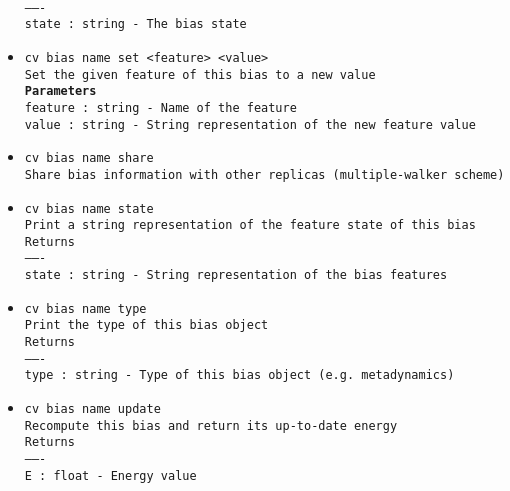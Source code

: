 \begin{itemize}
\\
\texttt{-------}
\\
\texttt{state : string - The bias state}
\item \texttt{cv bias name set <feature> <value>}
\\
\texttt{Set the given feature of this bias to a new value}
\\
\texttt{\textbf{Parameters}}
\\
\texttt{feature : string - Name of the feature}
\\
\texttt{value : string - String representation of the new feature value}
\item \texttt{cv bias name share}
\\
\texttt{Share bias information with other replicas (multiple-walker scheme)}
\item \texttt{cv bias name state}
\\
\texttt{Print a string representation of the feature state of this bias}
\\
\texttt{Returns}
\\
\texttt{-------}
\\
\texttt{state : string - String representation of the bias features}
\item \texttt{cv bias name type}
\\
\texttt{Print the type of this bias object}
\\
\texttt{Returns}
\\
\texttt{-------}
\\
\texttt{type : string - Type of this bias object (e.g. metadynamics)}
\item \texttt{cv bias name update}
\\
\texttt{Recompute this bias and return its up-to-date energy}
\\
\texttt{Returns}
\\
\texttt{-------}
\\
\texttt{E : float - Energy value}
\end{itemize}
